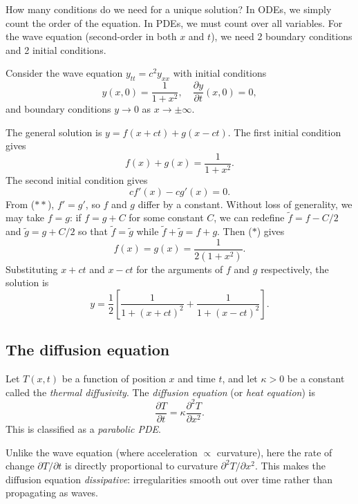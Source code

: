 \documentclass[a4paper]{article}
\begin{document}
\begin{remark}
  How many conditions do we need for a unique solution? In ODEs, we simply count the order of the equation. In PDEs, we must count over all variables. For the wave equation (second-order in both $x$ and $t$), we need 2 boundary conditions and 2 initial conditions.
\end{remark}

\begin{eg}
  Consider the wave equation $y_{tt} = c^2 y_{xx}$ with initial conditions
  \[
    y(x, 0) = \frac{1}{1 + x^2}, \quad \frac{\partial y}{\partial t}(x, 0) = 0,
  \]
  and boundary conditions $y \to 0$ as $x \to \pm \infty$.

  The general solution is $y = f(x + ct) + g(x - ct)$. The first initial condition gives
  \[
    f(x) + g(x) = \frac{1}{1 + x^2}. \tag{$*$}
  \]
  The second initial condition gives
  \[
    cf'(x) - cg'(x) = 0. \tag{$**$}
  \]
  From ($**$), $f' = g'$, so $f$ and $g$ differ by a constant. Without loss of generality, we may take $f = g$: if $f = g + C$ for some constant $C$, we can redefine $\tilde f = f - C/2$ and $\tilde g = g + C/2$ so that $\tilde f = \tilde g$ while $\tilde f + \tilde g = f + g$. Then ($*$) gives
  \[
    f(x) = g(x) = \frac{1}{2(1 + x^2)}.
  \]
  Substituting $x + ct$ and $x - ct$ for the arguments of $f$ and $g$ respectively, the solution is
  \[
    y = \frac{1}{2}\left[\frac{1}{1 + (x + ct)^2} + \frac{1}{1 + (x - ct)^2}\right].
  \]
\end{eg}

\subsection{The diffusion equation}

\begin{defi}
  Let $T(x, t)$ be a function of position $x$ and time $t$, and let $\kappa > 0$ be a constant called the \emph{thermal diffusivity}. The \emph{diffusion equation} (or \emph{heat equation}) is
  \[
    \frac{\partial T}{\partial t} = \kappa \frac{\partial^2 T}{\partial x^2}.
  \]
  This is classified as a \emph{parabolic PDE}.
\end{defi}

\begin{remark}
  Unlike the wave equation (where acceleration $\propto$ curvature), here the rate of change $\partial T/\partial t$ is directly proportional to curvature $\partial^2 T/\partial x^2$. This makes the diffusion equation \emph{dissipative}: irregularities smooth out over time rather than propagating as waves.
\end{remark}
\end{document}
